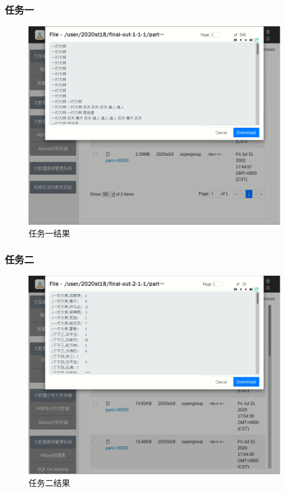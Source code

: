 \documentclass[a4paper,UTF8]{article}
\numberwithin{equation}{section}
\begin{document}
\subsubsection{任务一}
\begin{figure}[H]
    \centering
    \includegraphics[width = 15cm]{task1-1-output.png}
    \caption{任务一结果}
\end{figure}

\subsubsection{任务二}
\begin{figure}[H]
    \centering
    \includegraphics[width = 15cm]{task2-1-output.png}
    \caption{任务二结果}
\end{figure}
\end{document}
